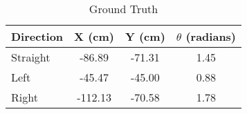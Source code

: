 \begin{table}[H]
\centering
\caption{Ground Truth}
\label{groundTruth}
\begin{tabular}{|l|c|c|c|}
\hline
\multicolumn{1}{|c|}{Direction} & X (cm)  & Y (cm) &  $\theta$ (radians) \\ \hline
Straight                        & -86.89  & -71.31 & 1.45            \\ %
Left                            & -45.47  & -45.00 & 0.88            \\ %
Right                           & -112.13 & -70.58 & 1.78            \\ \hline
\end{tabular}
\end{table}
